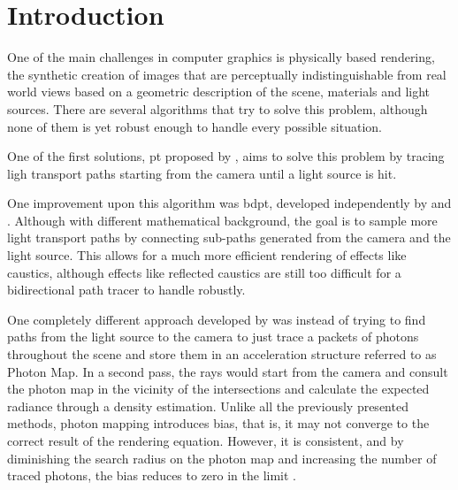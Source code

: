 \chapter{Introduction}

One of the main challenges in computer graphics is physically based rendering, the synthetic creation of images that are perceptually indistinguishable from real world views based on a geometric description of the scene, materials and light sources. There are several algorithms that try to solve this problem, although none of them is yet robust enough to handle every possible situation.

One of the first solutions, \gls{pt} proposed by \cite{Kajiya}, aims to solve this problem by tracing ligh transport paths starting from the camera until a light source is hit.

One improvement upon this algorithm was \gls{bdpt}, developed independently by \cite{Lafortune} and \cite{Veach}. Although with different mathematical background, the goal is to sample more light transport paths by connecting sub-paths generated from the camera and the light source. This allows for a much more efficient rendering of effects like caustics, although
effects like reflected caustics are still too difficult for a bidirectional path tracer to handle robustly.


One completely different approach developed by \cite{Jensen} was instead of trying to find paths from the light source to the camera to just trace a packets of photons throughout the scene and store them in an acceleration structure referred to as Photon Map. In a second pass, the rays would start from the camera and consult the photon map in the vicinity of the intersections and calculate the expected radiance through a density estimation. Unlike all the previously presented methods, photon mapping introduces bias, that is, it may not converge to the correct result of the rendering equation. However, it is consistent, and by diminishing the search radius on the photon map and increasing the number of traced photons, the bias reduces to zero in the limit \citep{Hachisuka}.

